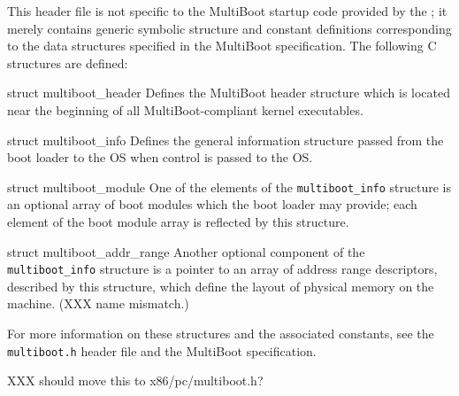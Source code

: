 \label{multiboot-h}
\begin{apisyn}
\end{apisyn}
\begin{apidesc}
	This header file is not specific to the MultiBoot startup code
	provided by the \oskit{};
	it merely contains generic symbolic structure and constant definitions
	corresponding to the data structures specified in the MultiBoot specification.
	The following C structures are defined:
	\begin{csymlist}
	\item[struct multiboot_header]		
		Defines the MultiBoot header structure
		which is located near the beginning
		of all MultiBoot-compliant kernel executables.
	\item[struct multiboot_info]		
		Defines the general information structure
		passed from the boot loader to the OS
		when control is passed to the OS.
	\item[struct multiboot_module]		
		One of the elements of the {\tt multiboot_info} structure
		is an optional array of boot modules
		which the boot loader may provide;
		each element of the boot module array
		is reflected by this structure.
	\item[struct multiboot_addr_range]	
		Another optional component of the {\tt multiboot_info} structure
		is a pointer to an array of address range descriptors,
		described by this structure,
		which define the layout of physical memory on the machine.
		(XXX name mismatch.)
	\end{csymlist}
	For more information on these structures and the associated constants,
	see the {\tt multiboot.h} header file and the MultiBoot specification.

	XXX should move this to x86/pc/multiboot.h?
\end{apidesc}

